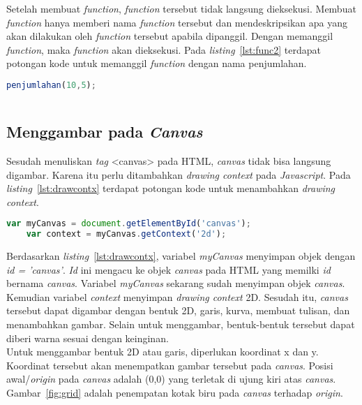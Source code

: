 Setelah membuat \textit{function}, \textit{function} tersebut tidak langsung dieksekusi. Membuat \textit{function} hanya memberi nama \textit{function} tersebut dan mendeskripsikan apa yang akan dilakukan oleh \textit{function} tersebut apabila dipanggil. Dengan memanggil \textit{function}, maka \textit{function} akan dieksekusi. Pada \textit{listing}~\ref{lst:func2} terdapat potongan kode untuk memanggil \textit{function} dengan nama penjumlahan.

\begin{lstlisting}[language=Javascript, caption=Memanggil \textit{function} penjumlahan, label={lst:func2}]
	penjumlahan(10,5);
	
\end{lstlisting}

\subsection{Menggambar pada \textit{Canvas}}
Sesudah menuliskan \textit{tag} <canvas> pada HTML, \textit{canvas} tidak bisa langsung digambar. Karena itu perlu ditambahkan \textit{drawing context} pada \textit{Javascript}. Pada \textit{listing}~\ref{lst:drawcontx} terdapat potongan kode untuk menambahkan \textit{drawing context}.

\begin{lstlisting}[language=Javascript, caption=Menambahkan \textit{drawing context canvas}, label={lst:drawcontx} ]
	var myCanvas = document.getElementById('canvas');
	var context = myCanvas.getContext('2d');
\end{lstlisting}

Berdasarkan \textit{listing}~\ref{lst:drawcontx}, variabel \textit{myCanvas} menyimpan objek dengan \textit{id = 'canvas'}. \textit{Id} ini mengacu ke objek \textit{canvas} pada HTML yang memilki \textit{id} bernama \textit{canvas}. Variabel \textit{myCanvas} sekarang sudah menyimpan objek \textit{canvas}. Kemudian variabel \textit{context} menyimpan \textit{drawing context} 2D. Sesudah itu, \textit{canvas} tersebut dapat digambar dengan bentuk 2D, garis, kurva, membuat tulisan, dan menambahkan gambar. Selain untuk menggambar, bentuk-bentuk tersebut dapat diberi warna sesuai dengan keinginan.\\

Untuk menggambar bentuk 2D atau garis, diperlukan koordinat x dan y. Koordinat tersebut akan menempatkan gambar tersebut pada \textit{canvas}. Posisi awal/\textit{origin} pada \textit{canvas} adalah (0,0) yang terletak di ujung kiri atas \textit{canvas}. Gambar~\ref{fig:grid} adalah penempatan kotak biru pada \textit{canvas} terhadap \textit{origin}.


